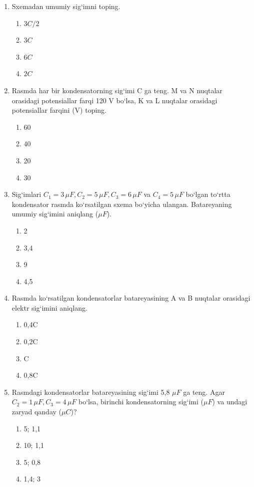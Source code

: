 \begin{enumerate}
\begin{enumerate}[label=\Alph*)]
\item $47C/16$
\item $14C/15$
\item $15C/7$
\item $12C/7$
\end{enumerate}

\item  Sxemadan umumiy sig‘imni toping.
\begin{enumerate}[label=\Alph*)]
\item $3C/2$
\item $3C$
\item $6C$
\item $2C$
\end{enumerate}

\item  Rasmda har bir kondensatorning sig‘imi C ga teng. M va N nuqtalar orasidagi potensiallar farqi 120 V bo‘lsa, K va L nuqtalar orasidagi potensiallar farqini (V) toping.
\begin{enumerate}[label=\Alph*)]
\item 60
\item 40
\item 20
\item 30
\end{enumerate}

\item  Sig‘imlari $C_1 = 3 \, \mu F, C_2 = 5 \, \mu F, C_3 = 6 \, \mu F$ va $C_4 = 5 \, \mu F$ bo‘lgan to‘rtta kondensator rasmda ko‘rsatilgan sxema bo‘yicha ulangan. Batareyaning umumiy sig‘imini aniqlang ($\mu F$).
\begin{enumerate}[label=\Alph*)]
\item 2
\item 3,4
\item 9
\item 4,5
\end{enumerate}

\item  Rasmda ko‘rsatilgan kondensatorlar batareyasining A va B nuqtalar orasidagi elektr sig‘imini aniqlang.
\begin{enumerate}[label=\Alph*)]
\item 0,4C
\item 0,2C
\item C
\item 0,8C
\end{enumerate}

\item  Rasmdagi kondensatorlar batareyasining sig‘imi 5,8 $\mu F$ ga teng. Agar $C_2 = 1 \, \mu F, C_3 = 4 \, \mu F$ bo‘lsa, birinchi kondensatorning sig‘imi ($\mu F$) va undagi zaryad qanday ($\mu C$)?
\begin{enumerate}[label=\Alph*)]
\item 5; 1,1
\item 10; 1,1
\item 5; 0,8
\item 1,4; 3
\end{enumerate}


\end{enumerate}
